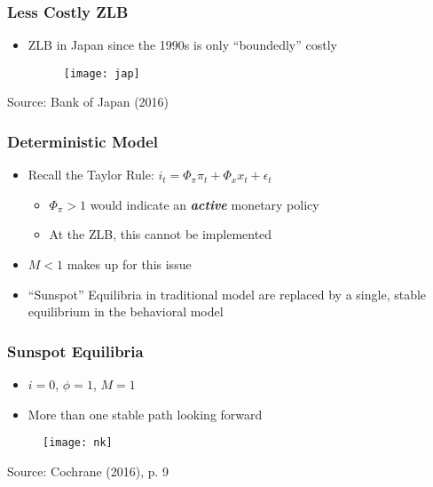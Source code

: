 \documentclass{beamer}
\begin{document}

\begin{frame}
	\frametitle{Less Costly ZLB}
	\begin{itemize}
		\item ZLB in Japan since the 1990s is only ``boundedly'' costly
		\begin{figure}[h]
			\texttt{[image: jap]}
		\end{figure}
	\end{itemize}
	{\footnotesize Source: Bank of Japan (2016)}
\end{frame}

 
\begin{frame}
	\frametitle{Deterministic Model}
	\begin{itemize}
		\item Recall the Taylor Rule: ${i}_{t}=\Phi_{\pi}{\pi}_{t}+\Phi_{x}x_{t}+\epsilon_{t}$
		\vspace{8pt}
		\begin{itemize}
			\item $\Phi_{\pi} > 1$ would indicate an \textit{\textbf{active}} monetary policy
			\item At the ZLB, this cannot be implemented
		\end{itemize}
		\vspace{8pt}
		\item $M < 1$ makes up for this issue
		\item ``Sunspot'' Equilibria in traditional model are replaced by a single, stable equilibrium in the behavioral model
	\end{itemize}
\end{frame}

 
\begin{frame}
	\frametitle{Sunspot Equilibria}
	\begin{itemize}
		\item $i = 0$, $\phi = 1$, $M = 1$
		\item More than one stable path looking forward
	\end{itemize}
	\begin{figure}[h]
		\texttt{[image: nk]}
	\end{figure}
	{\footnotesize Source: Cochrane (2016), p. 9}
\end{frame}
\end{document}
